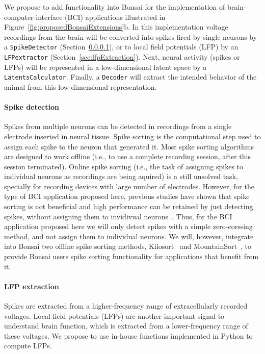 We propose to add functionality into Bonsai for the implementation of
brain-computer-interface (BCI) applications illustrated in
Figure~\ref{fig:proposedBonsaiExtensions}b. In
this implementation voltage recordings from the brain will be converted into
spikes fired by single neurons by a \texttt{SpikeDetector}
(Section~\ref{sec:spikeDetection}), or to local field potentials (LFP) by an
\texttt{LFPextractor} (Section~\ref{sec:lfpExtraction}). Next, neural activity
(spikes or LFPs) will be represented in a low-dimensional latent space by a
\texttt{LatentsCalculator}. Finally, a \texttt{Decoder} will extract the
intended behavior of the animal from this low-dimensional representation.

\paragraph{Spike detection}
\label{sec:spikeDetection}

Spikes from multiple neurons can be detected in recordings from a single
electrode inserted in neural tissue. Spike sorting is the computational step
used to assign each spike to the neuron that generated it. Most spike sorting
algorithms are designed to work offline (i.e., to use a complete recording
session, after this session terminated). Online spike sorting (i.e., the task
of assigning spikes to individual neurons as recordings are being aquired) is a
still unsolved task, specially for recording devices with large number of
electrodes.
%
However, for the type of BCI application proposed here, previous studies have
shown that spike sorting is not beneficial and high performance can be retained
by just detecting spikes, without assigning them to invidivual
neurons~\citep{trautmannEtAl19,todorovaEtAl14}. Thus, for the BCI application
proposed here we will only detect spikes with a simple zero-corssing method,
and not assign them to individual neurons.  We will, however, integrate into
Bonsai two offline spike sorting methods, Kilosort~\citep[][written in Matlab]{pachitariuEtAl16} and MountainSort~\citep[][written in
Python]{chungEtAl17}, to provide Bonsai users spike sorting functionality for
applications that benefit from it.

\paragraph{LFP extraction}
\label{sec:lfpExtractor}

Spikes are extracted from a higher-frequency range of extracellularly recorded
voltages. Local field potentials (LFPs) 
are another important signal to understand brain function, which is extracted
from a lower-frequency range of these voltages. We propose to use in-house
functions implemented in Python to compute LFPs.

